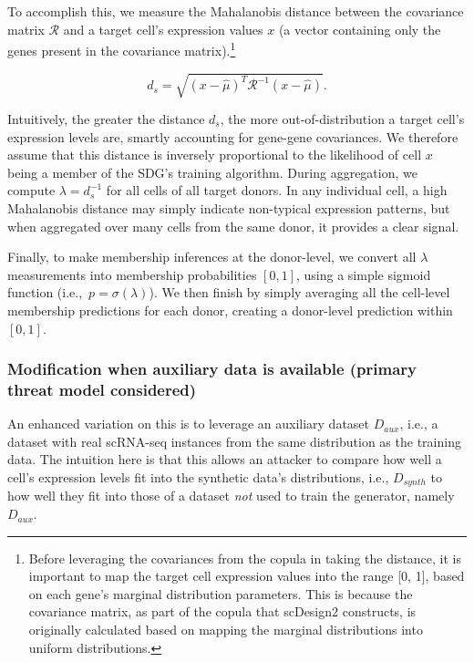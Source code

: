 \documentclass[unnumsec,webpdf,contemporary,large]{oup-authoring-template}%
\theoremstyle{thmstyleone}%
\theoremstyle{thmstyletwo}%
\theoremstyle{thmstylethree}%
\begin{document}
To accomplish this, we measure the Mahalanobis distance \citep{de_maesschalck_mahalanobis_2000} between the covariance matrix $\mathcal{R}$ and a target cell's expression values $x$ (a vector containing only the genes present in the covariance matrix).\footnote{Before leveraging the covariances from the copula in taking the distance, it is important to map the target cell expression values into the range [0, 1], based on each gene's marginal distribution parameters. This is because the covariance matrix, as part of the copula that scDesign2 constructs, is originally calculated based on mapping the marginal distributions into uniform distributions.}

\begin{equation}
    d_s = \sqrt{(x-\hat\mu)^T\mathcal{R}^{-1}(x-\hat\mu)}.
\end{equation}\label{eqn:mahala}

Intuitively, the greater the distance $d_s$, the more out-of-distribution a target cell's expression levels are, smartly accounting for gene-gene covariances. 
We therefore assume that this distance is inversely proportional to the likelihood of cell $x$ being a member of the SDG's training algorithm. During aggregation, we compute $\lambda = d_s^{-1}$ for all cells of all target donors. In any individual cell, a high Mahalanobis distance may simply indicate non-typical expression patterns, but when aggregated over many cells from the same donor, it provides a clear signal.

Finally, to make membership inferences at the donor-level, we convert all $\lambda$ measurements into membership probabilities $[0, 1]$, using a simple sigmoid function (i.e.,~$p = \sigma(\lambda)$). We then finish by simply averaging all the cell-level membership predictions for each donor, creating a donor-level prediction within $[0, 1]$.


\subsubsection{Modification when auxiliary data is available (primary threat model considered)}

An enhanced variation on this is to leverage an auxiliary dataset $D_{aux}$, i.e., a dataset with real scRNA-seq instances from the same distribution as the training data. The intuition here is that this allows an attacker to compare how well a cell's expression levels fit into the synthetic data's distributions, i.e., $D_{synth}$ to how well they fit into those of a dataset \textit{not} used to train the generator, namely $D_{aux}$.
\end{document}

